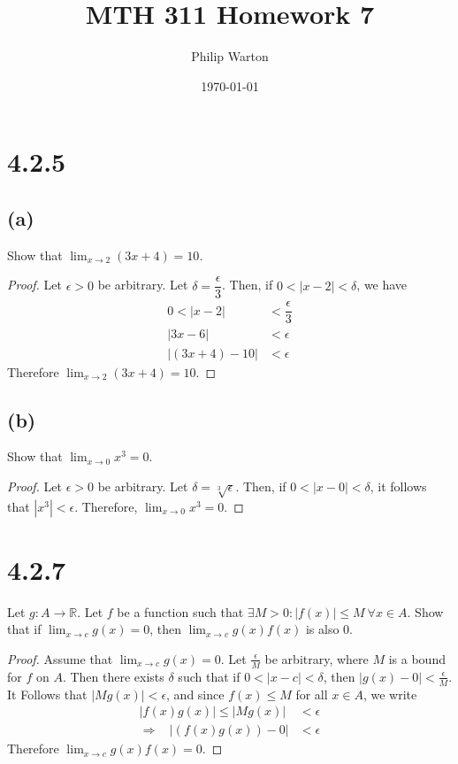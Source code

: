 \documentclass{article}
\begin{document}
\title{MTH 311 Homework 7}
\author{Philip Warton}
\date{\today}
\maketitle

\section*{4.2.5}

\subsection*{(a)}
Show that $\lim_{x \rightarrow 2}(3x+4) = 10$.
\begin{proof}
Let $\epsilon > 0$ be arbitrary. Let $\delta = \dfrac{\epsilon}{3}$. Then, if $0 < |x - 2| < \delta$, we have
\begin{align*}
0 < |x - 2| & < \dfrac{\epsilon}{3} \\
|3x-6| & < \epsilon \\
|(3x+4) - 10| & < \epsilon
\end{align*}
Therefore $\lim_{x \rightarrow 2}(3x+4) = 10$.
\end{proof}

\subsection*{(b)}
Show that $\lim_{x \rightarrow 0}x^3 = 0$.
\begin{proof}
Let $\epsilon > 0$ be arbitrary. Let $\delta = \sqrt[3]{\epsilon}$. Then, if $0 < |x-0| < \delta$, it follows that $|x^3| < \epsilon$. Therefore, $\lim_{x \rightarrow 0}x^3 = 0$.
\end{proof}

\section*{4.2.7}
Let $g:A \rightarrow \mathbb{R}$. Let $f$ be a function such that $\exists M > 0 : |f(x)| \leqslant M \ \forall x \in A$. Show that if $\lim_{x \rightarrow c}g(x) = 0$, then $\lim_{x \rightarrow c}g(x)f(x)$ is also 0.
\begin{proof}
Assume that $\lim_{x \rightarrow c}g(x) = 0$. Let $\frac{\epsilon}{M}$ be arbitrary, where $M$ is a bound for $f$ on $A$. Then there exists $\delta$ such that if $0 < |x-c| < \delta$, then $|g(x) - 0| < \frac{\epsilon}{M}$. It Follows that $|Mg(x)| < \epsilon$, and since $f(x) \leqslant M$ for all $x \in A$, we write
\begin{align*}
|f(x)g(x)| \leqslant |Mg(x)| & < \epsilon \\
\Rightarrow \ \  \ \ |(f(x)g(x)) - 0| & < \epsilon
\end{align*}
Therefore $\lim_{x \rightarrow c}g(x)f(x) = 0$.
\end{proof}
\end{document}
